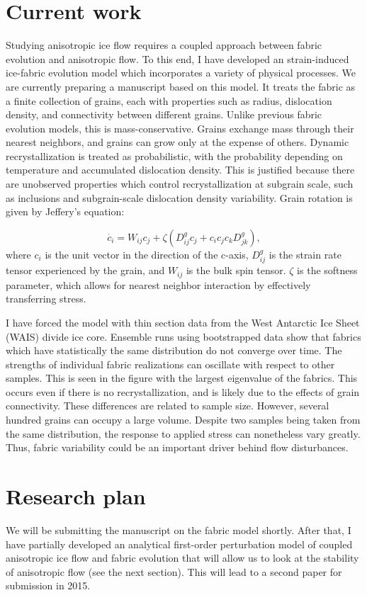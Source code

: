 \documentclass{article}
\begin{document}
\section{Current work}
Studying anisotropic ice flow requires a coupled approach between fabric evolution and anisotropic flow. To this end, I have developed an strain-induced ice-fabric evolution model which incorporates a variety of physical processes. We are currently preparing a manuscript based on this model. It treats the fabric as a finite collection of grains, each with properties such as radius, dislocation density, and connectivity between different grains. Unlike previous fabric evolution models, this is mass-conservative. Grains exchange mass through their nearest neighbors, and grains can grow only at the expense of others. Dynamic recrystallization is treated as probabilistic, with the probability depending on temperature and accumulated dislocation density. This is justified because there are unobserved properties which control recrystallization at subgrain scale, such as inclusions and subgrain-scale dislocation density variability. Grain rotation is given by Jeffery's equation: 

\begin{equation}
   \dot{c_i} = W_{ij}  c_j + \zeta \left( D^g_{ij} c_j + c_i c_j c_k D^g_{jk} \right),
\end{equation}
where $c_i$ is the unit vector in the direction of the c-axis, $D^g_{ij}$ is the strain rate tensor experienced by the grain, and $W_{ij}$ is the bulk spin tensor. $\zeta$ is the softness parameter, which allows for nearest neighbor interaction by effectively transferring stress.

I have forced the model with thin section data from the West Antarctic Ice Sheet (WAIS) divide ice core. Ensemble runs using bootstrapped data show that fabrics which have statistically the same distribution do not converge over time. The strengths of individual fabric realizations can oscillate with respect to other samples. This is seen in the figure with the largest eigenvalue of the fabrics. This occurs even if there is no recrystallization, and is likely due to the effects of grain connectivity. These differences are related to sample size. However, several hundred grains can occupy a large volume. Despite two samples being taken from the same distribution, the response to applied stress can nonetheless vary greatly. Thus, fabric variability could be an important driver behind flow disturbances. 

\section{Research plan}
We will be submitting the manuscript on the fabric model shortly. After that, I have partially developed an analytical first-order perturbation model of coupled anisotropic ice flow and fabric evolution that will allow us to look at the stability of anisotropic flow (see the next section). This will lead to a second paper for submission in 2015. 
\end{document}
